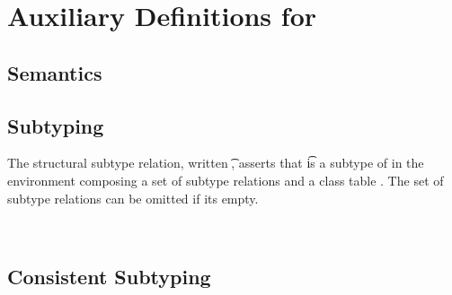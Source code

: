 \documentclass[acmlarge, anonymous, authordraft]{acmart}
\begin{document}
\clearpage

\appendix
\section{Auxiliary Definitions for \kafka}%
\label{appendix:kafka}



\subsection{Semantics}

\subsection{Subtyping}

The structural subtype relation, written \StrSub\M\K\t\tp, asserts that \t
is a subtype of \tp in the environment \M composing a set of subtype relations and
a class table \K.   The set of subtype relations can be omitted if its empty.

~\\

\begin{mathpar}


\end{mathpar}

\begin{mathpar}
\end{mathpar}

\subsection{Consistent Subtyping}
\end{document}
